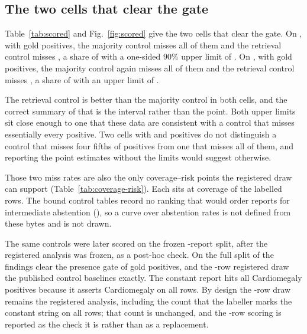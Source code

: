 \begin{table}[tbp]
\centering
\caption{\CapBatteryTable}
\label{tab:battery}
\small

\end{table}

\subsection{The two cells that clear the gate}

Table~\ref{tab:scored} and Fig.~\ref{fig:scored} give the two cells that clear
the gate. On \ScoredOne{}, with \ScoredOnePresent{} gold positives, the
majority control misses all of them and the retrieval control misses
\RetMissedOne{}, a share of \RetMissOne{} with a one-sided \(90\%\) upper limit
of \RetUpperOne{}. On \ScoredTwo{}, with \ScoredTwoPresent{} gold positives,
the majority control again misses all of them and the retrieval control misses
\RetMissedTwo{}, a share of \RetMissTwo{} with an upper limit of
\RetUpperTwo{}.

The retrieval control is better than the majority control in both cells, and
the correct summary of that is the interval rather than the point. Both upper
limits sit close enough to one that these data are consistent with a control
that misses essentially every positive. Two cells with \ScoredOnePresent{} and
\ScoredTwoPresent{} positives do not distinguish a control that misses four
fifths of positives from one that misses all of them, and reporting the point
estimates without the limits would suggest otherwise.

Those two miss rates are also the only coverage--risk points the registered
draw can support (Table~\ref{tab:coverage-risk}). Each sits at coverage
\CoverageRiskCoverage{} of the labelled rows. The bound control tables
record no ranking that would order reports for intermediate abstention
(\CoverageRiskRanking{}), so a curve over abstention rates is not defined
from these bytes and is not drawn.

The same controls were later scored on the frozen \FullSplitN{}-report split,
after the registered analysis was frozen, as a post-hoc check. On the full
split \FullSplitScorable{} of the \NFindings{} findings clear the presence gate
of \MinPresent{} gold positives, and the \NCohort{}-row registered draw
\FullSplitReproduces{} the published control baselines exactly. The constant
report hits all \FullSplitMajCardioHit{} Cardiomegaly positives because it
asserts Cardiomegaly on all \FullSplitMajCardioPred{} rows. By design the
\NCohort{}-row draw remains the registered analysis, including the count that
the labeller marks the constant string \MajAsserted{} on all \NCohort{} rows;
that count is unchanged, and the \FullSplitN{}-row scoring is reported as the
check it is rather than as a replacement.

